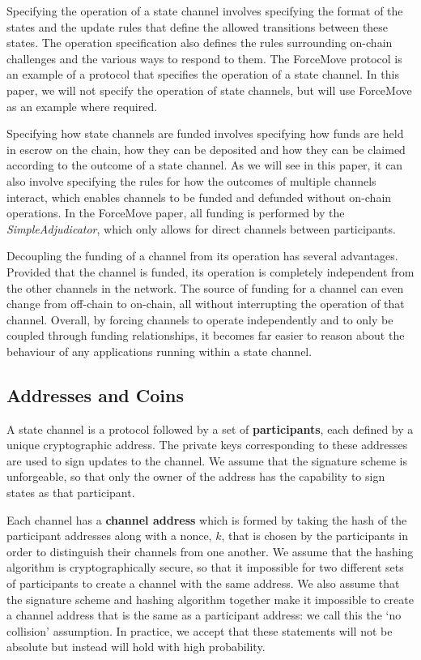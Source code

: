 \documentclass{article}
\begin{document}
Specifying the operation of a state channel involves specifying the format of the states and the update rules that define the allowed transitions between these states.
The operation specification also defines the rules surrounding on-chain challenges and the various ways to respond to them.
The ForceMove protocol is an example of a protocol that specifies the operation of a state channel.
In this paper, we will not specify the operation of state channels, but will use ForceMove as an example where required.

Specifying how state channels are funded involves specifying how funds are held in escrow on the chain, how they can be deposited and how they can be claimed according to the outcome of a state channel.
As we will see in this paper, it can also involve specifying the rules for how the outcomes of multiple channels interact, which enables channels to be funded and defunded without on-chain operations.
In the ForceMove paper, all funding is performed by the \textit{SimpleAdjudicator}, which only allows for direct channels between participants.

Decoupling the funding of a channel from its operation has several advantages.
Provided that the channel is funded, its operation is completely independent from the other channels in the network.
The source of funding for a channel can even change from off-chain to on-chain, all without interrupting the operation of that channel.
Overall, by forcing channels to operate independently and to only be coupled through funding relationships, it becomes far easier to reason about the behaviour of any applications running within a state channel.


\subsection{Addresses and Coins}

A state channel is a protocol followed by a set of \textbf{participants}, each defined by a unique cryptographic address.
The private keys corresponding to these addresses are used to sign updates to the channel.
We assume that the signature scheme is unforgeable, so that only the owner of the address has the capability to sign states as that participant.

Each channel has a \textbf{channel address} which is formed by taking the hash of the participant addresses along with a nonce, $k$, that is chosen by the participants in order to distinguish their channels from one another.
We assume that the hashing algorithm is cryptographically secure, so that it impossible for two different sets of participants to create a channel with the same address.
We also assume that the signature scheme and hashing algorithm together make it impossible to create a channel address that is the same as a participant address:
we call this the `no collision' assumption.
In practice, we accept that these statements will not be absolute but instead will hold with high probability.
\end{document}
